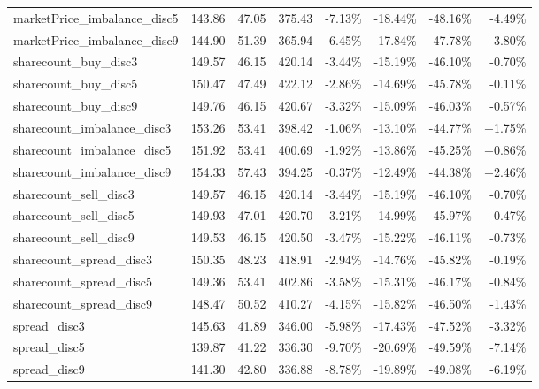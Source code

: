 \begin{table}[ht]
{\begin{tabular}{|lRRR|RRRR|}
marketPrice\_imbalance\_disc5        &    143.86 &   47.05 &  375.43 &   -7.13\% &  -18.44\% &  -48.16\% &       -4.49\% \\
marketPrice\_imbalance\_disc9        &    144.90 &   51.39 &  365.94 &   -6.45\% &  -17.84\% &  -47.78\% &       -3.80\% \\
sharecount\_buy\_disc3           &    149.57 &   46.15 &  420.14 &   -3.44\% &  -15.19\% &  -46.10\% &       -0.70\% \\
sharecount\_buy\_disc5           &    150.47 &   47.49 &  422.12 &   -2.86\% &  -14.69\% &  -45.78\% &       -0.11\% \\
sharecount\_buy\_disc9           &    149.76 &   46.15 &  420.67 &   -3.32\% &  -15.09\% &  -46.03\% &       -0.57\% \\
sharecount\_imbalance\_disc3     &    153.26 &   53.41 &  398.42 &   -1.06\% &  -13.10\% &  -44.77\% &        +1.75\% \\
sharecount\_imbalance\_disc5     &    151.92 &   53.41 &  400.69 &   -1.92\% &  -13.86\% &  -45.25\% &        +0.86\% \\
sharecount\_imbalance\_disc9     &    154.33 &   57.43 &  394.25 &   -0.37\% &  -12.49\% &  -44.38\% &        +2.46\% \\
sharecount\_sell\_disc3          &    149.57 &   46.15 &  420.14 &   -3.44\% &  -15.19\% &  -46.10\% &       -0.70\% \\
sharecount\_sell\_disc5          &    149.93 &   47.01 &  420.70 &   -3.21\% &  -14.99\% &  -45.97\% &       -0.47\% \\
sharecount\_sell\_disc9          &    149.53 &   46.15 &  420.50 &   -3.47\% &  -15.22\% &  -46.11\% &       -0.73\% \\
sharecount\_spread\_disc3        &    150.35 &   48.23 &  418.91 &   -2.94\% &  -14.76\% &  -45.82\% &       -0.19\% \\
sharecount\_spread\_disc5        &    149.36 &   53.41 &  402.86 &   -3.58\% &  -15.31\% &  -46.17\% &       -0.84\% \\
sharecount\_spread\_disc9        &    148.47 &   50.52 &  410.27 &   -4.15\% &  -15.82\% &  -46.50\% &       -1.43\% \\
spread\_disc3                   &    145.63 &   41.89 &  346.00 &   -5.98\% &  -17.43\% &  -47.52\% &       -3.32\% \\
spread\_disc5                   &    139.87 &   41.22 &  336.30 &   -9.70\% &  -20.69\% &  -49.59\% &       -7.14\% \\
spread\_disc9                   &    141.30 &   42.80 &  336.88 &   -8.78\% &  -19.89\% &  -49.08\% &       -6.19\% \\

\end{tabular}}
\end{table}
